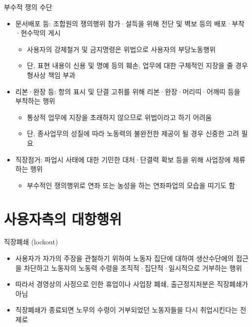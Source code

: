 \documentclass[aspectratio=169,xcolor=dvipsnames,handout]{beamer}
\begin{document}
\begin{frame}{부수적 쟁의 수단}
    \begin{itemize}[<+->]
        \item 문서배포 등: 조합원의 쟁의행위 참가·설득을 위해 전단 및 벽보 등의 배포·부착·현수막의 게시
        \begin{itemize}[<+->]
            \item 사용자의 강제철거 및 금지명령은 위법으로 사용자의 부당노동행위
            \item 단, 표현 내용이 신용 및 명예 등의 훼손, 업무에 대한 구체적인 지장을 줄 경우 형사상 책임 부과
        \end{itemize}
    \item 리본·완장 등: 항의 표시 및 단결 고취를 위해 리본·완장·머리띠·어깨띠 등을 부착하는 행위
        \begin{itemize}[<+->]
            \item 통상적 업무에 지장을 초래하지 않으므로 위법이라고 하기 어려움
            \item 단, 종사업무의 성질에 따라 노동력의 불완전한 제공이 될 경우 신중한 고려 필요
        \end{itemize}
    \item 직장점거: 파업시 사태에 대한 기민한 대처·단결력 확보 등을 위해 사업장에 체류하는 행위
        \begin{itemize}[<+->]
            \item 부수적인 쟁의행위로 연좌 또는 농성을 하는 연좌파업의 모습을 띠기도 함
        \end{itemize}
    \end{itemize}
\end{frame}

\section{사용자측의 대항행위}

\begin{frame}{직장폐쇄 (lockout)}
    \begin{itemize}[<+->]
        \item 사용자가 자가의 주장을 관철하기 위하여 노동자 집단에 대하여 생산수단에의 접근을 차단하고 노동자의 노동력 수령을 조직적·집단적·일시적으로 거부하는 행위 
        \item 따라서 경영상의 사정으로 인한 휴업이나 사업장 폐쇄, 출근정지처분은 직장폐쇄가 아님
        \item 직장폐쇄가 종료되면 노무의 수령이 거부되었던 노동자들을 다시 취업시킨다는 전제로
    \end{itemize}
\end{frame}
\end{document}

